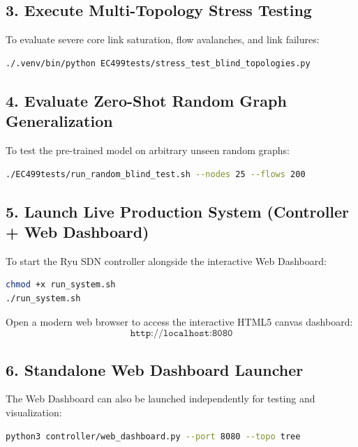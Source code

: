 \subsection{3. Execute Multi-Topology Stress Testing}
To evaluate severe core link saturation, flow avalanches, and link failures:
\begin{lstlisting}[language=bash]
./.venv/bin/python EC499tests/stress_test_blind_topologies.py
\end{lstlisting}

\subsection{4. Evaluate Zero-Shot Random Graph Generalization}
To test the pre-trained model on arbitrary unseen random graphs:
\begin{lstlisting}[language=bash]
./EC499tests/run_random_blind_test.sh --nodes 25 --flows 200
\end{lstlisting}

\subsection{5. Launch Live Production System (Controller + Web Dashboard)}
To start the Ryu SDN controller alongside the interactive Web Dashboard:
\begin{lstlisting}[language=bash]
chmod +x run_system.sh
./run_system.sh
\end{lstlisting}
Open a modern web browser to access the interactive HTML5 canvas dashboard:
\begin{equation*}
    \texttt{http://localhost:8080}
\end{equation*}

\subsection{6. Standalone Web Dashboard Launcher}
The Web Dashboard can also be launched independently for testing and visualization:
\begin{lstlisting}[language=bash]
python3 controller/web_dashboard.py --port 8080 --topo tree
\end{lstlisting}

